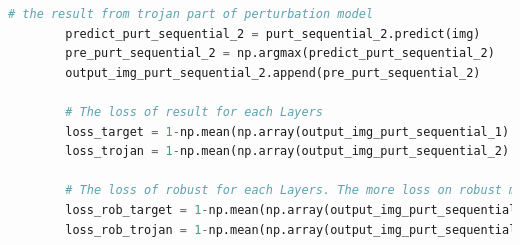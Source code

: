 \documentclass[english,version-2022-01]{uzl-thesis}
\begin{document}
\begin{lstlisting}[language=Python]
        # the result from trojan part of perturbation model
        predict_purt_sequential_2 = purt_sequential_2.predict(img)
        pre_purt_sequential_2 = np.argmax(predict_purt_sequential_2)
        output_img_purt_sequential_2.append(pre_purt_sequential_2)

        # The loss of result for each Layers    
        loss_target = 1-np.mean(np.array(output_img_purt_sequential_1) == np.array(ValY))
        loss_trojan = 1-np.mean(np.array(output_img_purt_sequential_2) == np.array(ValY))

        # The loss of robust for each Layers. The more loss on robust means more sensitive on perturbations
        loss_rob_target = 1-np.mean(np.array(output_img_purt_sequential_1) == np.array(output_img_orig_sequential_1))
        loss_rob_trojan = 1-np.mean(np.array(output_img_purt_sequential_2) == np.array(output_img_orig_sequential_2))
\end{lstlisting}
\end{document}
